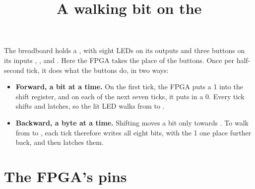 \documentclass[11pt,a4paper]{article}
\title{A walking bit on the \name{74HC595}}
\author{}
\date{}
\begin{document}
\maketitle

\begin{figure}[H]
  \centering
\end{figure}

The breadboard holds a , with eight LEDs on its outputs and three buttons on its inputs , , and . Here the FPGA takes the place of the buttons. Once per half-second tick, it does what the buttons do, in two ways:
\begin{itemize}[nosep]
  \item \textbf{Forward, a bit at a time.} On the first tick, the FPGA puts a 1 into the shift register, and on each of the next seven ticks, it puts in a 0. Every tick shifts and latches, so the lit LED walks from  to .
  \item \textbf{Backward, a byte at a time.} Shifting moves a bit only towards . To walk from  to , each tick therefore writes all eight bits, with the 1 one place further back, and then latches them.
\end{itemize}

\section*{The FPGA’s pins}
\end{document}
